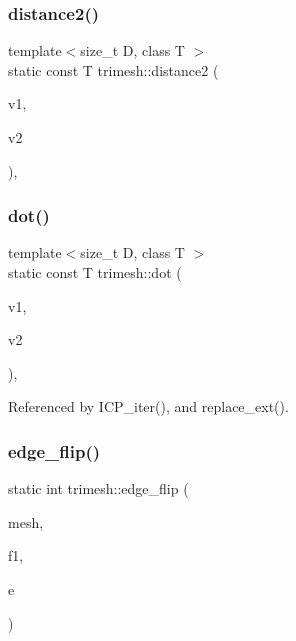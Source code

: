 \mbox{\label{namespacetrimesh_a5de6b8e4e289110f54c69ce88d2304a2}} 
\subsubsection{\texorpdfstring{distance2()}{distance2()}}
{\footnotesize\ttfamily template$<$size\+\_\+t D, class T $>$ \\
static const T trimesh\+::distance2 (\begin{DoxyParamCaption}\item[{const \hyperlink{classtrimesh_1_1Vec}{Vec}$<$ D, T $>$ \&}]{v1,  }\item[{const \hyperlink{classtrimesh_1_1Vec}{Vec}$<$ D, T $>$ \&}]{v2 }\end{DoxyParamCaption})\hspace{0.3cm}{\ttfamily [inline]}, {\ttfamily [static]}}

\mbox{\label{namespacetrimesh_a5d326e02a6fb5bd967f9c502d2bad5cc}} 
\subsubsection{\texorpdfstring{dot()}{dot()}}
{\footnotesize\ttfamily template$<$size\+\_\+t D, class T $>$ \\
static const T trimesh\+::dot (\begin{DoxyParamCaption}\item[{const \hyperlink{classtrimesh_1_1Vec}{Vec}$<$ D, T $>$ \&}]{v1,  }\item[{const \hyperlink{classtrimesh_1_1Vec}{Vec}$<$ D, T $>$ \&}]{v2 }\end{DoxyParamCaption})\hspace{0.3cm}{\ttfamily [inline]}, {\ttfamily [static]}}



Referenced by I\+C\+P\+\_\+iter(), and replace\+\_\+ext().

\mbox{\label{namespacetrimesh_a77fa200471c2aa3e4c840ff365886565}} 
\subsubsection{\texorpdfstring{edge\+\_\+flip()}{edge\_flip()}}
{\footnotesize\ttfamily static int trimesh\+::edge\+\_\+flip (\begin{DoxyParamCaption}\item[{\hyperlink{classtrimesh_1_1TriMesh}{Tri\+Mesh} $\ast$}]{mesh,  }\item[{int}]{f1,  }\item[{int}]{e }\end{DoxyParamCaption})\hspace{0.3cm}{\ttfamily [static]}}




